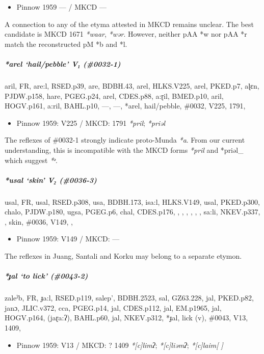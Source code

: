\documentclass[a4paper,]{article}
\providecommand{\tightlist}{%
  \setlength{\itemsep}{0pt}\setlength{\parskip}{0pt}}
\let\oldsubparagraph\subparagraph
\renewcommand{\subparagraph}[1]{\oldsubparagraph{#1}\mbox{}}
\begin{document}
\begin{itemize}
\tightlist
\item
  Pinnow 1959 --- / MKCD ---
\end{itemize}

A connection to any of the etyma attested in MKCD remains unclear. The
best candidate is MKCD 1671 \emph{*waar}, \emph{*wər}. However, neither
pAA *w nor pAA *r match the reconstructed pM *b and *l.

\subparagraph{\texorpdfstring{\emph{*arel} `hail/pebble' V₁
(\#0032-1)}{*arel hail/pebble V₁ (\#0032-1)}}\label{arel-hailpebble-v-0032-1}

aril, FR, are:l, RSED.p39, are, BDBH.43, arel, HLKS.V225, arel, PKED.p7,
aɭɛn, PJDW.p158, hare, PGEG.p24, arel, CDES.p88, a:ɽil, BMED.p10, aril,
HOGV.p161, a:ril, BAHL.p10, ---, ---, *arel, hail/pebble, \#0032, V225,
1791,

\begin{itemize}
\tightlist
\item
  Pinnow 1959: V225 / MKCD: 1791 \emph{*pril}; \emph{*priəl}
\end{itemize}

The reflexes of \#0032-1 strongly indicate proto-Munda \emph{*a}. From
our current understanding, this is incompatible with the MKCD forms
\emph{*pril} and *priəl\_ which suggest \emph{*ᵊ}.

\subparagraph{\texorpdfstring{\emph{*usal} `skin' V₂
(\#0036-3)}{*usal skin V₂ (\#0036-3)}}\label{usal-skin-v-0036-3}

usal, FR, usal, RSED.p308, usa, BDBH.173, isa:l, HLKS.V149, usal,
PKED.p300, chalo, PJDW.p180, ugsa, PGEG.p6, chal, CDES.p176, , , , , , ,
sa:li, NKEV.p337, , skin, \#0036, V149, ,

\begin{itemize}
\tightlist
\item
  Pinnow 1959: V149 / MKCD: ---
\end{itemize}

The reflexes in Juang, Santali and Korku may belong to a separate
etymon.

\subparagraph{\texorpdfstring{\emph{*ɟal} `to lick'
(\#0043-2)}{*ɟal to lick (\#0043-2)}}\label{ux25fal-to-lick-0043-2}

zaleˀb, FR, ɟa:l, RSED.p119, salep', BDBH.2523, sal, GZ63.228, jal,
PKED.p82, janɔ, JLIC.v372, cca, PGEG.p14, jal, CDES.p112, jal, EM.p1965,
jal, HOGV.p164, (jaɽa:ʔ), BAHL.p60, jal, NKEV.p312, *ɟal, lick (v),
\#0043, V13, 1409,

\begin{itemize}
\tightlist
\item
  Pinnow 1959: V13 / MKCD: ? 1409 \emph{*{[}c{]}limʔ};
  \emph{*{[}c{]}liəmʔ}; \emph{*{[}c{]}laim{[} {]}}
\end{itemize}
\end{document}
